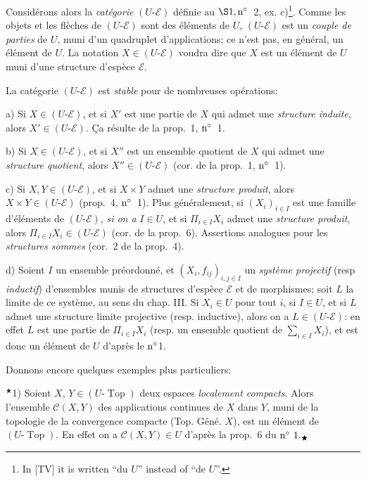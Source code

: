 \documentclass[12pt]{article}
\newcommand{\nn}{\noindent}
\newcommand{\Top}{\operatorname{Top}}
\begin{document}
Considérons alors la \emph{catégorie} $(U\text{-}\mathcal{E})$ définie au $\S1,\rm n^\circ$~2, ex. c)\footnote{In [TV] it is written ``du $U$'' instead of ``de $U$''.}. Comme les objets et les flèches de $(U\text{-}\mathcal{E})$ sont des éléments de $U$, $(U\text{-}\mathcal{E})$ est un \emph{couple de parties} de $U$, muni d'un quadruplet d'applications; ce n'est pas, en général, un élément de $U$. La notation $X\in (U\text{-}\mathcal{E})$ voudra dire que $X$ est un élément de $U$ muni d'une structure d'espèce $\mathcal{E}$.

La catégorie $(U\text{-}\mathcal{E})$ est \emph{stable} pour de nombreuses opérations:

\nn a) Si $X\in(U\text{-}\mathcal{E})$, et si $X'$ est une partie de $X$ qui admet une \emph{structure induite}, alors $X'\in(U\text{-}\mathcal{E})$. Ça résulte de la prop.~1, $\rm n^\circ$~1.

\nn b) Si $X\in (U\text{-}\mathcal{E})$, et si $X''$ est un ensemble quotient de $X$ qui admet une \emph{structure quotient}, alors $X''\in
(U\text{-}\mathcal{E})$ (cor. de la prop.~1, $\rm n^\circ$~1).

\nn c) Si $X,Y\in (U\text{-}\mathcal{E})$, et si $X\times Y$ admet une \emph{structure produit}, alors $X\times Y\in(U\text{-}\mathcal{E})$ (prop.~4, $\rm n^\circ$~1). Plus généralement, si $(X_i)_{i\in I}$ est une famille d'éléments de $(U\text{-}\mathcal{E})$, \emph{si on a} $I\in U$, et si $\Pi_{i\in I}X_i$ admet une \emph{structure produit}, alors $\Pi_{i\in I}X_i\in (U\text{-}\mathcal{E})$ (cor. de la prop.~6). Assertions analogues pour les \emph{structures sommes} (cor.~2 de la prop.~4).

\nn d) Soient $I$ un ensemble préordonné, et $(X_i, f_{ij})_{i,j\in I}$ un \emph{système projectif} (resp \emph{inductif}) d'ensembles munis de structures d'espèce $\mathcal{E}$ et de morphismes; soit $L$ la limite de ce système, au sens du chap. III. Si $X_i\in U$ pour tout $i$, si $I\in U$, et si $L$ admet une structure limite projective (resp. inductive), alors on a $L\in(U\text{-}\mathcal{E})$: en effet $L$ est une partie de $\Pi_{i\in I}X_i$ (resp. un ensemble quotient de $\sum_{i\in I}X_i$), et est donc un élément de $U$ d'après le $\rm n^\circ$1.

Donnons encore quelques exemples plus particuliers:

\nn${}^\bigstar$1) Soient $X$, $Y\in (U\text{-}\Top)$ deux espaces \emph{localement compacts}. Alors l'ensemble $\mathcal{C}(X,Y)$ des applications continues de $X$ dans $Y$, muni de la topologie de la convergence compacte (Top. Géné. $X$), est un élément de $(U\text{-}\Top)$. En effet on a $\mathcal{C}(X,Y)\in U$ d'après la prop.~6 du $\rm n^\circ\ 1.{}_\bigstar$
\end{document}
